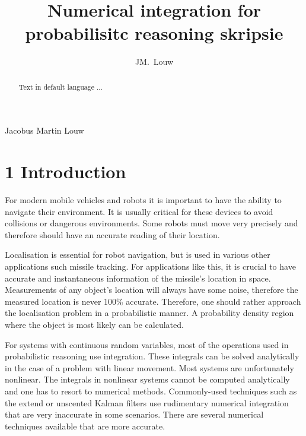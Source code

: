 \documentclass[12pt,oneside,openany,a4paper, %
afrikaans,english,
]{memoir}
\numberwithin{equation}{chapter}
\newcommand*{\WaterMark}[2][0.15\paperwidth]{%
\AddToShipoutPicture*{\AtTextCenter{%
\parbox[c]{0pt}{\makebox[0pt][c]{%
\texttt{[image: \#2]}}}}}}
\begin{document}
\title{Numerical integration for probabilisitc reasoning skripsie}
\author{JM.\ Louw}{Jacobus Martin Louw}
\frontmatter
\WaterMark{UScrest-WM}
\TitlePage

\DeclarationPage

\address{Department of Electrical and Electronic Engineering,\\
University of Stellenbosch,\\
Private Bag X1, 7602 Matieland, South Africa.}
\begin{abstract}
Text in default language ...
\end{abstract}

\chapter{1 Introduction}
For modern mobile vehicles and robots it is important to have the ability to navigate their environment. It is usually critical for these devices to avoid collisions or dangerous environments. Some robots must move very precisely and therefore should have an accurate reading of their location.

Localisation is essential for robot navigation, but is used in various other applications such missile tracking. For applications like this, it is crucial to have accurate and instantaneous information of the missile's location in space. Measurements of any object's location will always have some noise, therefore the measured location is never 100\% accurate. Therefore, one should rather approach the localisation problem in a probabilistic manner. A probability density region where the object is most likely can be calculated.

For systems with continuous random variables, most of the operations used in probabilistic reasoning use integration. These integrals can be solved analytically in the case of a problem with linear movement. Most systems are unfortunately nonlinear. The integrals in nonlinear systems cannot be computed analytically and one has to resort to numerical methods. Commonly-used techniques such as the extend or unscented Kalman filters use rudimentary numerical integration that are very inaccurate in some scenarios. There are several numerical techniques available that are more accurate.
\end{document}
